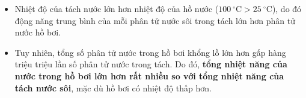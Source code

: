 \begin{vidumau}
{\begin{enumerate}
\begin{itemize}
				\begin{itemize}
					\item Nhiệt độ của tách nước lớn hơn nhiệt độ của hồ nước ($100\ ^\circ\mathrm{C} > 25\ ^\circ\mathrm{C}$), do đó động năng trung bình của mỗi phân tử nước sôi trong tách lớn hơn phân tử nước hồ bơi.
					\item Tuy nhiên, tổng số phân tử nước trong hồ bơi khổng lồ lớn hơn gấp hàng triệu triệu lần số phân tử nước trong tách. Do đó, \textbf{tổng nhiệt năng của nước trong hồ bơi lớn hơn rất nhiều so với tổng nhiệt năng của tách nước sôi}, mặc dù hồ bơi có nhiệt độ thấp hơn.
				\end{itemize}
			\end{itemize}
		\end{enumerate}
	}
\end{vidumau}

